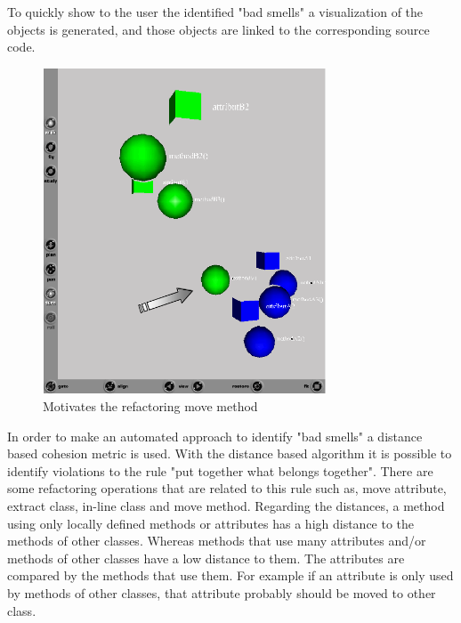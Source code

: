 To quickly show to the user the identified "bad smells" a visualization of the objects is generated, and those objects are linked to the corresponding source code. 

\begin{figure}[h!]
  \centering
  \includegraphics[width=0.75\textwidth]{img/metricsbasedrefactoring.png}
  \caption{Motivates the refactoring move method}
  \label{fig:MetricsBasedRefactoring}
\end{figure}

In order to make an automated approach to identify "bad smells" a distance based cohesion metric is used.
With the distance based algorithm it is possible to identify violations to the rule "put together what belongs together". 
There are some refactoring operations that are related to this rule such as, move attribute, extract class, in-line class and move method. 
Regarding the distances, a method using only locally defined methods or attributes has a high distance to the methods of other classes. 
Whereas methods that use many attributes and/or methods of other classes have a low distance to them. 
The attributes are compared by the methods that use them. 
For example if an attribute is only used by methods of other classes, that attribute probably should be moved to other class.




